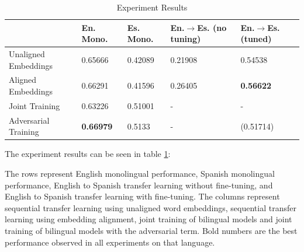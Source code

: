 \documentclass[]{article}
\begin{document}
\begin{center}
	\begin{table}
		\begin{tabular}{| p{2.5cm} || p{2cm} | p{2cm} | p{2cm} | p{2cm} |}
			\hline
			& En. Mono. & Es. Mono. & En.$\to$Es. (no tuning) & En.$\to$Es. (tuned)\\
			\hline
			Unaligned Embeddings & 0.65666 & 0.42089 & 0.21908 & 0.54538 \\
			\hline
			Aligned Embeddings & 0.66291 & 0.41596 & 0.26405 & \textbf{0.56622} \\
			\hline
			Joint Training & 0.63226 & 0.51001 & - & - \\
			\hline
			Adversarial Training & \textbf{0.66979} & 0.5133 & - & (0.51714) \\
			\hline
		\end{tabular}
		\caption{Experiment Results}\label{table:res}
	\end{table}
\end{center}

The experiment results can be seen in table \ref{table:res}:

The rows represent English monolingual performance, Spanish monolingual performance, English to Spanish transfer learning without fine-tuning, and English to Spanish transfer learning with fine-tuning. The columns represent sequential transfer learning using unaligned word embeddings, sequential transfer learning using embedding alignment, joint training of bilingual models and joint training of bilingual models with the adversarial term. Bold numbers are the best performance observed in all experiments on that language.
\end{document}
